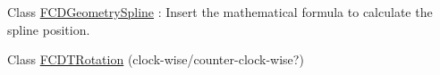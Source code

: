 \label{todo__todo000005}
\hypertarget{todo__todo000005}{}
 
\begin{DoxyDescription}
\item[Class \hyperlink{classFCDGeometrySpline}{FCDGeometrySpline} ]: Insert the mathematical formula to calculate the spline position.
\end{DoxyDescription}

\label{todo__todo000010}
\hypertarget{todo__todo000010}{}
 
\begin{DoxyDescription}
\item[Class \hyperlink{classFCDTRotation}{FCDTRotation} ](clock-\/wise/counter-\/clock-\/wise?)


\end{DoxyDescription}